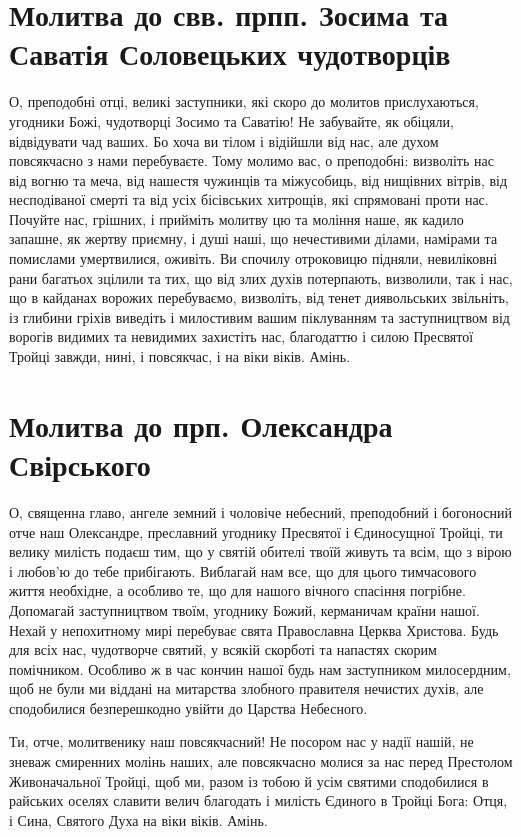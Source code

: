 \documentclass[chapters.tex]{subfiles}
\begin{document}
\section{Молитва до свв. прпп. Зосима та Саватія Соловецьких чудотворців}
О, преподобні отці, великі заступники, які скоро до молитов прислухаються, угодники Божі, чудотворці Зосимо та Саватію! Не забувайте, як обіцяли, відвідувати чад ваших. Бо хоча ви тілом і відійшли від нас, але духом повсякчасно з нами перебуваєте. Тому молимо вас, о преподобні: визволіть нас від вогню та меча, від нашестя чужинців та міжусобиць, від нищівних вітрів, від несподіваної смерті та від усіх бісівських хитрощів, які спрямовані проти нас. Почуйте нас, грішних, і прийміть молитву цю та моління наше, як кадило запашне, як жертву приємну, і душі наші, що нечестивими ділами, намірами та помислами умертвилися, оживіть. Ви спочилу отроковицю підняли, невиліковні рани багатьох зцілили та тих, що від злих духів потерпають, визволили, так і нас, що в кайданах ворожих перебуваємо, визволіть, від тенет диявольських звільніть, із глибини гріхів виведіть і милостивим вашим піклуванням та заступництвом від ворогів видимих та невидимих захистіть нас, благодаттю і силою Пресвятої Тройці завжди, нині, і повсякчас, і на віки віків. Амінь.

\section{Молитва до прп. Олександра Свірського}
О, священна главо, ангеле земний і чоловіче небесний, преподобний і богоносний отче наш Олександре, преславний угоднику Пресвятої і Єдиносущної Тройці, ти велику милість подаєш тим, що у святій обителі твоїй живуть та всім, що з вірою і любов’ю до тебе прибігають. Виблагай нам все, що для цього тимчасового життя необхідне, а особливо те, що для нашого вічного спасіння погрібне. Допомагай заступництвом твоїм, угоднику Божий, керманичам країни нашої. Нехай у непохитному мирі перебуває свята Православна Церква Христова. Будь для всіх нас, чудотворче святий, у всякій скорботі та напастях скорим помічником. Особливо ж в час кончин нашої будь нам заступником милосердним, щоб не були ми віддані на митарства злобного правителя нечистих духів, але сподобилися безперешкодно увійти до Царства Небесного.

Ти, отче, молитвенику наш повсякчасний! Не посором нас у надії нашій, не зневаж смиренних молінь наших, але повсякчасно молися за нас перед Престолом Живоначальної Тройці, щоб ми, разом із тобою й усім святими сподобилися в райських оселях славити велич благодать і милість Єдиного в Тройці Бога: Отця, і Сина, Святого Духа на віки віків. Амінь.
\end{document}

